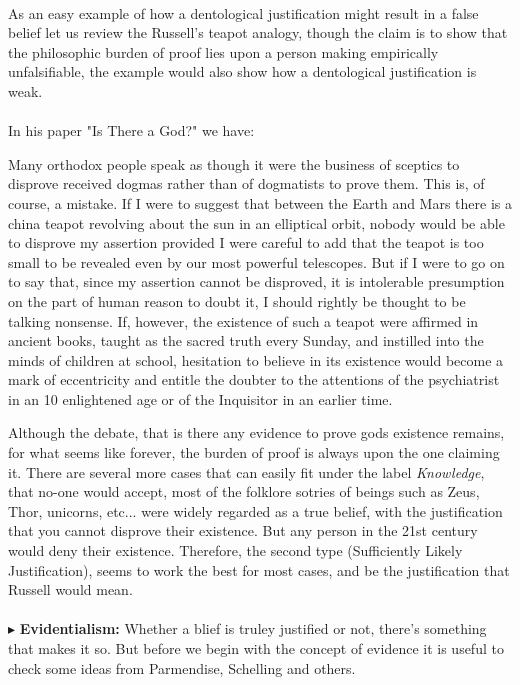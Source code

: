 \documentclass[9pt,a4paper,twocolumn]{article}
\newcommand{\newpoint}[1]{\indent$\blacktriangleright$ \textbf{#1}}
\begin{document}
                \\
                As an easy example of how a dentological justification might result in a false belief let us review the Russell's teapot analogy, though the claim is to show that the philosophic burden of proof lies upon a person making empirically unfalsifiable, the example would also show how a dentological justification is weak. \cite{enwiki:1149010951}
                \\
                \\
                In his paper "Is There a God?" we have:
                \begin{qt}
                    Many orthodox people speak as though it were the business of sceptics to disprove received dogmas rather than of dogmatists to prove them. This is, of course, a mistake. If I were to suggest that between the Earth and Mars there is a china teapot revolving about the sun in an elliptical orbit, nobody would be able to disprove my assertion provided I were careful to add that the teapot is too small to be revealed even by our most powerful telescopes. But if I were to go on to say that, since my assertion cannot be disproved, it is intolerable presumption on the part of human reason to doubt it, I should rightly be thought to be talking nonsense. If, however, the existence of such a teapot were affirmed in ancient books, taught as the sacred truth every Sunday, and instilled into the minds of children at school, hesitation to believe in its existence would become a mark of eccentricity and entitle the doubter to the attentions of the psychiatrist in an 10 enlightened age or of the Inquisitor in an earlier time.
                \end{qt}
                Although the debate, that is there any evidence to prove gods existence remains, for what seems like forever, the burden of proof is always upon the one claiming it. There are several more cases that can easily fit under the label \textit{Knowledge}, that no-one would accept, most of the folklore sotries of beings such as Zeus, Thor, unicorns, etc... were widely regarded as a true belief, with the justification that you cannot disprove their existence. But any person in the 21st century would deny their existence. Therefore, the second type (Sufficiently Likely Justification), seems to work the best for most cases, and be the justification that Russell would mean.\cite{Russell1952}
                \\
                \\
                \newpoint{Evidentialism:} Whether a blief is truley justified or not, there's something that makes it so. But before we begin with the concept of evidence it is useful to check some ideas from Parmendise, Schelling and others.
\end{document}
